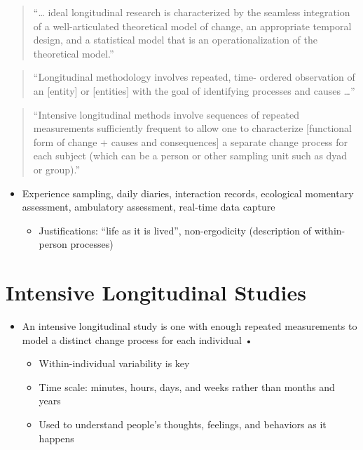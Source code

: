 \documentclass[
]{book}
\providecommand{\tightlist}{%
  \setlength{\itemsep}{0pt}\setlength{\parskip}{0pt}}
\theoremstyle{definition}
\theoremstyle{definition}
\theoremstyle{definition}
\theoremstyle{definition}
\theoremstyle{remark}
\begin{document}
\begin{quote}
``\ldots{} ideal longitudinal research is characterized by the seamless
integration of a well-articulated theoretical model of change, an
appropriate temporal design, and a statistical model that is an
operationalization of the theoretical model.''
\citet{collins_analysis_2006}
\end{quote}

\begin{quote}
``Longitudinal methodology involves repeated, time- ordered observation
of an {[}entity{]} or {[}entities{]} with the goal of identifying processes
and causes \ldots{}'' \citet{nesselroade_longitudinal_1979}
\end{quote}

\begin{quote}
``Intensive longitudinal methods involve sequences of repeated
measurements sufficiently frequent to allow one to characterize
{[}functional form of change + causes and consequences{]} a separate
change process for each subject (which can be a person or other
sampling unit such as dyad or group).''
\end{quote}

\begin{itemize}
\item
  Experience sampling, daily diaries, interaction records, ecological
  momentary assessment, ambulatory assessment, real-time data capture

  \begin{itemize}
  \tightlist
  \item
    Justifications: ``life as it is lived'', non-ergodicity
    (description of within-person processes)
  \end{itemize}
\end{itemize}

\section{Intensive Longitudinal Studies}\label{intensive-longitudinal-studies}

\begin{itemize}
\item
  An intensive longitudinal study is one with enough repeated
  measurements to model a distinct change process for each individual
  •

  \begin{itemize}
  \item
    Within-individual variability is key
  \item
    Time scale: minutes, hours, days, and weeks rather than months
    and years
  \item
    Used to understand people's thoughts, feelings, and behaviors as
    it happens
  \end{itemize}
\end{itemize}
\end{document}
